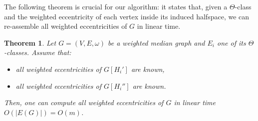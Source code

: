\documentclass[11pt,letterpaper]{article}
\newtheorem{theorem}{Theorem}
\begin{document}
The following theorem is crucial for our algorithm: it states that, given a $\Theta$-class and the weighted eccentricity of each vertex inside its induced halfspace, we can re-assemble all weighted eccentricities of $G$ in linear time.

\begin{theorem}
Let $G=(V,E,\omega)$ be a weighted median graph and $E_i$ one of its $\Theta$-classes. Assume that:
\begin{itemize}
\item all weighted eccentricities of $G[H_i']$ are known,
\item all weighted eccentricities of $G[H_i'']$ are known.
\end{itemize}
Then, one can compute all weighted eccentricities of $G$ in linear time $O(\vert E(G)\vert) = O(m)$.
\label{th:balanced_recursion}
\end{theorem}
\end{document}
